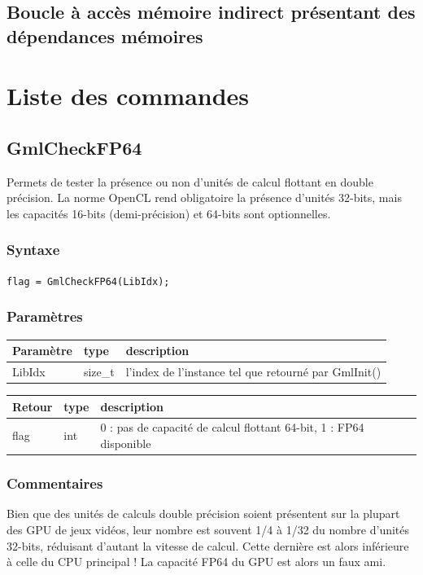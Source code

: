 \documentclass[a4paper,12pt]{article}
\begin{document}
\subsection{Boucle à accès mémoire indirect présentant des dépendances mémoires}


%
%

\section{Liste des commandes}

\subsection{GmlCheckFP64}

Permets de tester la présence ou non d'unités de calcul flottant en double précision.
La norme OpenCL rend obligatoire la présence d'unités 32-bits, mais les capacités 16-bits (demi-précision) et 64-bits sont optionnelles.

\subsubsection*{Syntaxe}
{\tt flag = GmlCheckFP64(LibIdx);}
\subsubsection*{Paramètres}

\begin{tabular}{|m{2cm}|m{1.5cm}|m{10.5cm}|}
\hline
Paramètre  & type    & description \\
\hline
LibIdx     & size\_t & l'index de l'instance tel que retourné par GmlInit() \\
\hline
\end{tabular}

\medskip

\begin{tabular}{|m{2cm}|m{1.5cm}|m{10.5cm}|}
\hline
Retour     & type   & description \\
\hline
flag       & int    & 0 : pas de capacité de calcul flottant 64-bit, 1 : FP64 disponible \\
\hline
\end{tabular}
\subsubsection*{Commentaires}
Bien que des unités de calculs double précision soient présentent sur la plupart des GPU de jeux vidéos, leur nombre est souvent 1/4 à 1/32 du nombre d'unités 32-bits, réduisant d'autant la vitesse de calcul.
Cette dernière est alors inférieure à celle du CPU principal !
La capacité FP64 du GPU est alors un faux ami.
\end{document}

